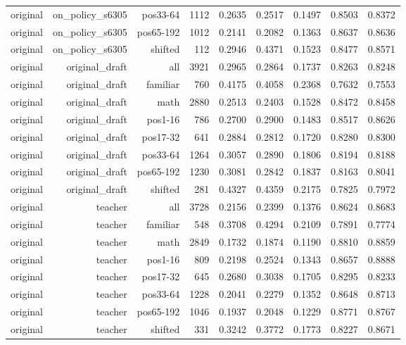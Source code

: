 \begin{tabular}{lrrrrrrrr}
original & on\_policy\_s6305 & pos33-64 & 1112 & 0.2635 & 0.2517 & 0.1497 & 0.8503 & 0.8372 \\
original & on\_policy\_s6305 & pos65-192 & 1012 & 0.2141 & 0.2082 & 0.1363 & 0.8637 & 0.8636 \\
original & on\_policy\_s6305 & shifted & 112 & 0.2946 & 0.4371 & 0.1523 & 0.8477 & 0.8571 \\
original & original\_draft & all & 3921 & 0.2965 & 0.2864 & 0.1737 & 0.8263 & 0.8248 \\
original & original\_draft & familiar & 760 & 0.4175 & 0.4058 & 0.2368 & 0.7632 & 0.7553 \\
original & original\_draft & math & 2880 & 0.2513 & 0.2403 & 0.1528 & 0.8472 & 0.8458 \\
original & original\_draft & pos1-16 & 786 & 0.2700 & 0.2900 & 0.1483 & 0.8517 & 0.8626 \\
original & original\_draft & pos17-32 & 641 & 0.2884 & 0.2812 & 0.1720 & 0.8280 & 0.8300 \\
original & original\_draft & pos33-64 & 1264 & 0.3057 & 0.2890 & 0.1806 & 0.8194 & 0.8188 \\
original & original\_draft & pos65-192 & 1230 & 0.3081 & 0.2842 & 0.1837 & 0.8163 & 0.8041 \\
original & original\_draft & shifted & 281 & 0.4327 & 0.4359 & 0.2175 & 0.7825 & 0.7972 \\
original & teacher & all & 3728 & 0.2156 & 0.2399 & 0.1376 & 0.8624 & 0.8683 \\
original & teacher & familiar & 548 & 0.3708 & 0.4294 & 0.2109 & 0.7891 & 0.7774 \\
original & teacher & math & 2849 & 0.1732 & 0.1874 & 0.1190 & 0.8810 & 0.8859 \\
original & teacher & pos1-16 & 809 & 0.2198 & 0.2524 & 0.1343 & 0.8657 & 0.8888 \\
original & teacher & pos17-32 & 645 & 0.2680 & 0.3038 & 0.1705 & 0.8295 & 0.8233 \\
original & teacher & pos33-64 & 1228 & 0.2041 & 0.2279 & 0.1352 & 0.8648 & 0.8713 \\
original & teacher & pos65-192 & 1046 & 0.1937 & 0.2048 & 0.1229 & 0.8771 & 0.8767 \\
original & teacher & shifted & 331 & 0.3242 & 0.3772 & 0.1773 & 0.8227 & 0.8671 \\
\bottomrule
\end{tabular}

